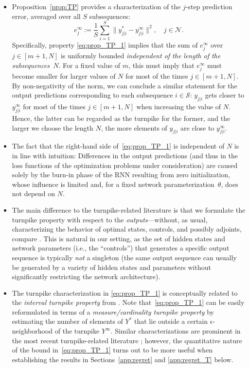 \documentclass{article} %
\begin{document}
\begin{itemize}
	
	\item Proposition~\ref{prop:TP} provides a characterization of the $j$-step prediction error, averaged over all $S$ subsequences:
	\begin{equation*}
		e^{\infty}_j := \frac{1}{S}\sum_{i=1}^{S}\|{y}_{j|i}^*-{y}_{j|i}^\infty\|^2, \quad j\in\mathcal{N}.
	\end{equation*}
	Specifically, property \eqref{eq:prop_TP_1} implies that the sum of $e^{\infty}_j$ over $j\in[m+1,N]$ is uniformly bounded \emph{independent of the length of the subsequences~$N$}. For a fixed value of $m$, this must imply that $e^{\infty}_j$ must become smaller for larger values of $N$ for most of the times $j\in[m+1,N]$. By non-negativity of the norm, we can conclude a similar statement for the output predictions corresponding to each subsequence $i\in\mathcal{S}$: $y_{j|i}$ gets closer to $y_{j|i}^\infty$ for most of the times $j\in[m+1,N]$ when increasing the value of $N$. Hence, the latter can be regarded as the turnpike for the former, and the larger we choose the length $N$, the more elements of $y_{j|i}$ are close to $y_{j|i}^\infty$.
	
	\item The fact that the right-hand side of~\eqref{eq:prop_TP_1} is independent of $N$ is in line with intuition: Differences in the output predictions (and thus in the loss functions of the optimization problems under consideration) are caused solely by the burn-in phase of the RNN resulting from zero initialization, whose influence is limited and, for a fixed network parameterization~$\theta$, does not depend on $N$.
	
	\item The main difference to the turnpike-related literature is that we formulate the turnpike property with respect to the \emph{outputs}---without, as usual, characterizing the behavior of optimal states, controls, and possibly adjoints, compare \citet{Trelat2025,Faulwasser2022,Zaslavski2006,Carlson1991}. This is natural in our setting, as the set of hidden states and network parameters (i.e., the ``controls'') that generates a specific output sequence is typically \emph{not} a singleton (the same output sequence can usually be generated by a variety of hidden states and parameters without significantly restricting the network architecture).
		
	\item The turnpike characterization in \eqref{eq:prop_TP_1} is conceptually related to the \emph{interval turnpike property} from \citet{Faulwasser2022a}. Note that~\eqref{eq:prop_TP_1} can be easily reformulated in terms of a \textit{measure/cardinality turnpike property} by estimating the number of elements of $Y^*$ that lie outside a certain $\epsilon$-neighborhood of the turnpike $Y^\infty$.
	Similar characterizations are prominent in the most recent turnpike-related literature \citep{Trelat2025,Faulwasser2022,Gruene2019,Faulwasser2018}; however, the quantitative nature of the bound in~\eqref{eq:prop_TP_1} turns out to be more useful when establishing the results in Sections~\ref{app:regret} and \ref{app:regret_T} below.
	

\end{itemize}
\end{document}
